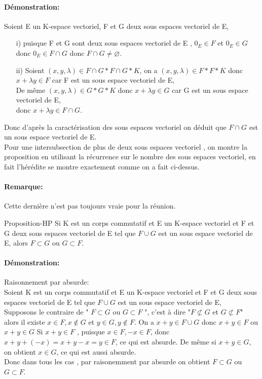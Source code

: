 \documentclass{book}
\begin{document}
\paragraph{Démonstration: }
Soient E un K-espace vectoriel, F et G deux sous espaces vectoriel de E,
\\
\begin{itemize}
    \item[i)] puisque F et G sont deux sous espaces vectoriel de E , \(0_{E} \in F\) et \(0_{E} \in G\) donc \(0_{E} \in F \cap G\) donc \(F \cap G \neq \varnothing\).
    \item[ii)] Soient \((x,y,\lambda) \in F \cap G * F \cap G * K\), on a \((x,y,\lambda) \in F  * F  * K\) donc \(x+\lambda y \in F\) car F est un sous espace vectoriel de E,
    \\ De même \((x,y,\lambda) \in  G *  G * K\) donc \(x+\lambda y \in G\) car G est un sous espace vectoriel de E,
    \\ donc \(x+\lambda y \in F \cap G\).
\end{itemize}
Donc d'après la caractérisation des sous espaces vectoriel on déduit que \(F \cap G\) est un sous espace vectoriel de E.
\newline
\\ Pour une intersubsection de plus de deux sous espaces vectoriel , on montre la proposition en utilisant la récurrence sur le nombre des sous espaces vectoriel, en fait l'hérédite se montre exactement comme on a fait ci-dessus.
\paragraph{Remarque:}
Cette dernière n'est pas toujours vraie pour la réunion.
\begin{HP}[]{Proposition-HP}{}
Si K est un corps commutatif et E un K-espace vectoriel et F et G deux sous espaces vectoriel de E tel que \(F \cup G\) est un sous espace vectoriel de E, alors \(F \subset G\) ou \(G \subset F\).
\end{HP}
\paragraph{Démonstration:}
Raisonnement par absurde:
\newline
\\ Soient K est un corps commutatif et E un K-espace vectoriel et F et G deux sous espaces vectoriel de E tel que \(F \cup G\) est un sous espace vectoriel de E,
\newline
\\ Supposons le contraire de " \(F \subset G\) ou \(G \subset F\) ", c'est à dire "\(F \not\subset G\) et \(G \not\subset F\)" alors il existe \(x \in F, x \notin G\)
 et \(y \in G, y \notin F\). 
 \newline
 On a \(x+y \in F \cup G\) donc \( x+y \in F\) ou \(x+y \in G\)
 Si \( x+y \in F\) , puisque \(x \in F, -x \in F\), donc \(x+y+(-x)=x+y-x=y \in F\), ce qui est absurde.
 De même si \( x+y \in G\), on obtient \(x \in G\), ce qui est aussi absurde.
 \newline
 \\ Donc dans tous les cas , par raisonemment par absurde on obtient \(F \subset G\) ou \(G \subset F\).
\end{document}
